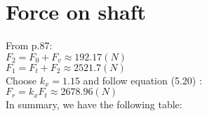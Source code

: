 \section{Force on shaft}
From p.87:\\
$ F_2 = F_0 + F_v \approx 192.17 \unit{(N)}$\\
$ F_1 = F_t + F_2 \approx 2521.7 \unit{(N)}$\\
Choose $ k_x=1.15 $ and follow equation (5.20) :\\
$ F_r = k_xF_t \approx 2678.96\unit{(N)} $\\
In summary, we have the following table:
\newpage
